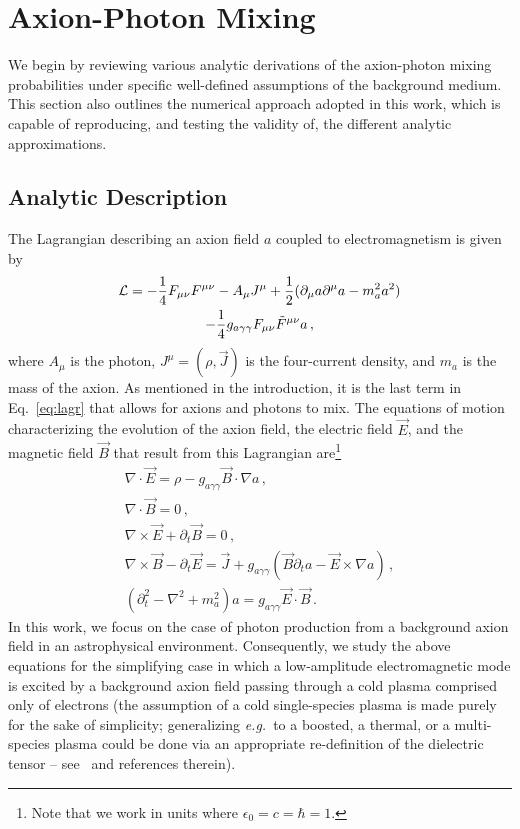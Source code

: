 \documentclass[twocolumn,superscriptaddress,floatfix,preprintnumbers,prd,nofootinbib,aps,10pt]{revtex4-2}
\renewcommand\({\left(}
\renewcommand\){\right)}
\renewcommand\[{\left[}
\renewcommand\]{\right]}
\newcommand\eg{{\it e.g.}~}
\begin{document}
\section{Axion-Photon Mixing}\label{sec:method}
We begin by reviewing various analytic derivations of the axion-photon mixing probabilities under specific well-defined assumptions of the background medium. This section also outlines the numerical approach adopted in this work, which is capable of reproducing, and testing the validity of, the different analytic approximations.

\subsection{Analytic Description}
The Lagrangian describing an axion field $a$ coupled to electromagnetism is given by
%
\begin{multline}\label{eq:lagr}
    \mathcal{L} = -\frac{1}{4} F_{\mu\nu} F^{\mu\nu} - A_{\mu} J^{\mu} + \frac{1}{2} (\partial_\mu a \partial^\mu a - m_a^2 a^2) \\
    - \frac{1}{4} g_{a \gamma\gamma} F_{\mu\nu} \Tilde{F}^{\mu\nu} a \, ,
\end{multline}
%
where $A_\mu$ is the photon, $J^\mu = (\rho, \vec{J})$ is the four-current density, and $m_a$ is the mass of the axion. As mentioned in the introduction, it is the last term in Eq.~\ref{eq:lagr} that allows for axions and photons to mix. The equations of motion characterizing the evolution of the axion field, the electric field $\vec{E}$, and the magnetic field $\vec{B}$ that result from this Lagrangian are\footnote{Note that we work in units where $\epsilon_0 = c = \hbar = 1.$}
%
\begin{gather}
    \nabla \cdot \vec{E} = \rho - g_{a\gamma\gamma} \vec{B} \cdot \nabla a \, , \\
    \nabla \cdot \vec{B} = 0 \, , \\
    \nabla \times \vec{E} + \partial_t \vec{B} = 0 \, , \label{eq:maxfar} \\
    \nabla \times \vec{B} - \partial_t \vec{E} = \vec{J} + g_{a\gamma\gamma}(\vec{B} \partial_t a - \vec{E} \times \nabla a) \, , \label{eq:amp} \\
    (\partial_t^2 - \nabla^2 + m_a^2) a = g_{a\gamma\gamma} \vec{E} \cdot \vec{B} \, .
\end{gather}
%
In this work, we focus on the case of photon production from a background axion field in an astrophysical environment. Consequently, we study the above equations for the simplifying case in which a low-amplitude electromagnetic mode is excited by a background axion field passing through a cold plasma comprised only of electrons (the assumption of a cold single-species plasma is made purely for the sake of simplicity; generalizing \eg to a boosted, a thermal, or a multi-species plasma could be done via an appropriate re-definition of the dielectric tensor -- see~\cite{Witte2021} and references therein). 
\end{document}
